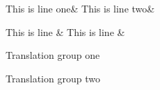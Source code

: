 \documentclass{memoir}
\begin{document}
\begin{pairs}
\begin{Leftside} 
\beginnumbering
\begin{astanza}
This is line one&
This is line two\&
\end{astanza}
\begin{astanza}
This is line &
This is line \&
\end{astanza}
\endnumbering
\end{Leftside}
\begin{Rightside} 
\beginnumbering
\autopar
\noindent Translation group one\pend

\noindent Translation group two\pend
\endnumbering
\end{Rightside}
\end{pairs}
\Columns
{}
\end{document}

